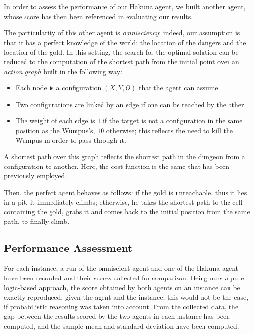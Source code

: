 \documentclass{llncs}
\begin{document}
In order to assess the performance of our Hakuna agent, we built another agent, whose score has then been referenced in evaluating our results.

The particularity of this other agent is \emph{omnisciency}: indeed, our assumption is that it has a perfect knowledge of the world: the location of the dangers and the location of the gold.
In this setting, the search for the optimal solution can be reduced to the computation of the shortest path from the initial point over an \emph{action graph} built in the following way:
\begin{itemize}
	\item Each node is a configuration $(X,Y,O)$ that the agent can assume.
	\item Two configurations are linked by an edge if one can be reached by the other.
	\item The weight of each edge is $1$ if the target is not a configuration in the same position as the Wumpus's, $10$ otherwise; this reflects the need to kill the Wumpus in order to pass through it.
\end{itemize}
A shortest path over this graph reflects the shortest path in the dungeon from a configuration to another.
Here, the cost function is the same that has been previously employed.

Then, the perfect agent behaves as follows: if the gold is unreachable, thus it lies in a pit, it immediately climbs; otherwise, he takes the shortest path to the cell containing the gold, grabs it and comes back to the initial position from the same path, to finally climb.

\subsection{Performance Assessment}

For each instance, a run of the omniscient agent and one of the Hakuna agent have been recorded and their scores collected for comparison.
Being ours a pure logic-based approach, the score obtained by both agents on an instance can be exactly reproduced, given the agent and the instance; this would not be the case, if probabilistic reasoning was taken into account.
From the collected data, the gap between the results scored by the two agents in each instance has been computed, and the sample mean and standard deviation have been computed.
\end{document}
